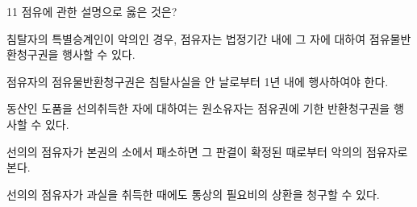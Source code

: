 \begin{question}{11}
점유에 관한 설명으로 옳은 것은?
\begin{choices}
  \item 침탈자의 특별승계인이 악의인 경우, 점유자는 법정기간 내에 그 자에 대하여 점유물반환청구권을 행사할 수 있다.
  \item 점유자의 점유물반환청구권은 침탈사실을 안 날로부터 1년 내에 행사하여야 한다.
  \item 동산인 도품을 선의취득한 자에 대하여는 원소유자는 점유권에 기한 반환청구권을 행사할 수 있다.
  \item 선의의 점유자가 본권의 소에서 패소하면 그 판결이 확정된 때로부터 악의의 점유자로 본다.
  \item 선의의 점유자가 과실을 취득한 때에도 통상의 필요비의 상환을 청구할 수 있다.
\end{choices}
\end{question}
